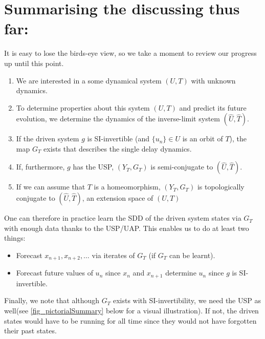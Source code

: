 \documentclass[a4paper,12pt,twoside]{report}
\newtheorem{Theorem}{Theorem}[]
\begin{document}


\section*{Summarising the discussing thus far:}

It is easy to lose the birds-eye view, so we take a moment to review our progress up until this point.

\vspace{-8mm}
\begin{enumerate}
\item We are interested in a some dynamical system $(U,T)$ with unknown dynamics.
\item To determine properties about this system $(U,T)$ and predict its future evolution, we determine the dynamics of the inverse-limit system $(\widehat{U}, \widehat{T})$.
\item If the driven system $g$ is SI-invertible (and $\{u_n\}\in{U}$  is an orbit of $T$), the map $G_T$ exists that describes the single delay dynamics. 
\item If, furthermore, $g$ has the USP, $(Y_T, G_T)$ is semi-conjugate to $(\widehat{U}, \widehat{T})$.
\item If we can assume that $T$ is a homeomorphism, $(Y_T, G_T)$ is topologically conjugate to $(\widehat{U}, \widehat{T})$, an extension space of $(U,T)$
\end{enumerate} 

One can therefore in practice learn the SDD of the driven system states via $G_T$ with enough data thanks to the USP/UAP. This enables us to do at least two things: 
\vspace{-8mm}
\begin{itemize}
\item Forecast  $x_{n+1},x_{n+2}, \ldots$ via iterates of $G_T$ (if $G_T$ can be learnt).
\item Forecast future values of $u_n$ since $x_n$ and $x_{n+1}$ determine $u_n$ since $g$ is SI-invertible. 
\end{itemize} 


Finally, we note that although $G_T$ exists with SI-invertibility, we need the USP as well(see \ref{fig_pictorialSummary} below for a visual illustration). If not, the driven states would have to be running for all time since they would not have forgotten their past states. 
\end{document}
